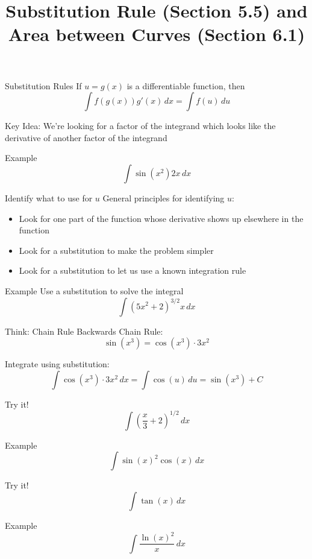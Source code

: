 \documentclass[t]{beamer}
\title{Substitution Rule (Section 5.5) and \\
Area between Curves (Section 6.1)}
\date{}
\begin{document}
\frame{\titlepage}

\begin{frame}{Substitution Rules}
If $u = g(x)$ is a differentiable function, then
$$ \int f(g(x)) g'(x) \, dx = \int f(u) \, du $$

Key Idea: We're looking for a factor of the integrand which looks like the
derivative of another factor of the integrand
\end{frame}

\begin{frame}{Example}
$$\int \sin(x^2) 2x \, dx $$
\end{frame}

\begin{frame}{Identify what to use for $u$}
General principles for identifying $u$:
\begin{itemize}
\item Look for one part of the function whose derivative shows up
elsewhere in the function
\item Look for a substitution to make the problem simpler
\item Look for a substitution to let us use a known integration rule
\end{itemize}
\end{frame}

\begin{frame}{Example}
Use a substitution to solve the integral
$$\int (5x^2 + 2)^{3/2} x \, dx$$
\end{frame}

\begin{frame}{Think: Chain Rule Backwards}
Chain Rule:
$$ \sin(x^3) = \cos(x^3) \cdot 3x^2 $$

Integrate using substitution:
$$ \int \cos(x^3) \cdot 3x^2 \, dx = \int \cos(u) \, du = \sin(x^3) + C $$
\end{frame}

\begin{frame}{Try it!}
$$\int \left( \frac{x}{3} + 2 \right)^ {1/2} \, dx $$
\end{frame}

\begin{frame}{Example}
$$ \int \sin(x)^2 \cos(x) \, dx $$
\end{frame}

\begin{frame}{Try it!}
$$\int \tan(x) \, dx $$
\end{frame}

\begin{frame}{Example}
$$ \int \frac{\ln(x)^2}{x} \, dx$$
\end{frame}
\end{document}
